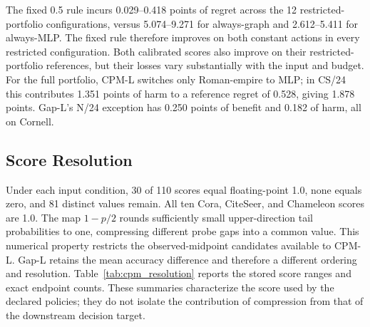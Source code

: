 The fixed 0.5 rule incurs 0.029--0.418 points of regret across the 12 restricted-portfolio configurations, versus 5.074--9.271 for always-graph and 2.612--5.411 for always-MLP. The fixed rule therefore improves on both constant actions in every restricted configuration. Both calibrated scores also improve on their restricted-portfolio references, but their losses vary substantially with the input and budget. For the full portfolio, CPM-L switches only Roman-empire to MLP; in CS/24 this contributes 1.351 points of harm to a reference regret of 0.528, giving 1.878 points. Gap-L's N/24 exception has 0.250 points of benefit and 0.182 of harm, all on Cornell.


\subsection{Score Resolution}

Under each input condition, 30 of 110 scores equal floating-point 1.0, none equals zero, and 81 distinct values remain. All ten Cora, CiteSeer, and Chameleon scores are 1.0. The map $1-p/2$ rounds sufficiently small upper-direction tail probabilities to one, compressing different probe gaps into a common value. This numerical property restricts the observed-midpoint candidates available to CPM-L. Gap-L retains the mean accuracy difference and therefore a different ordering and resolution. Table~\ref{tab:cpm_resolution} reports the stored score ranges and exact endpoint counts. These summaries characterize the score used by the declared policies; they do not isolate the contribution of compression from that of the downstream decision target.

